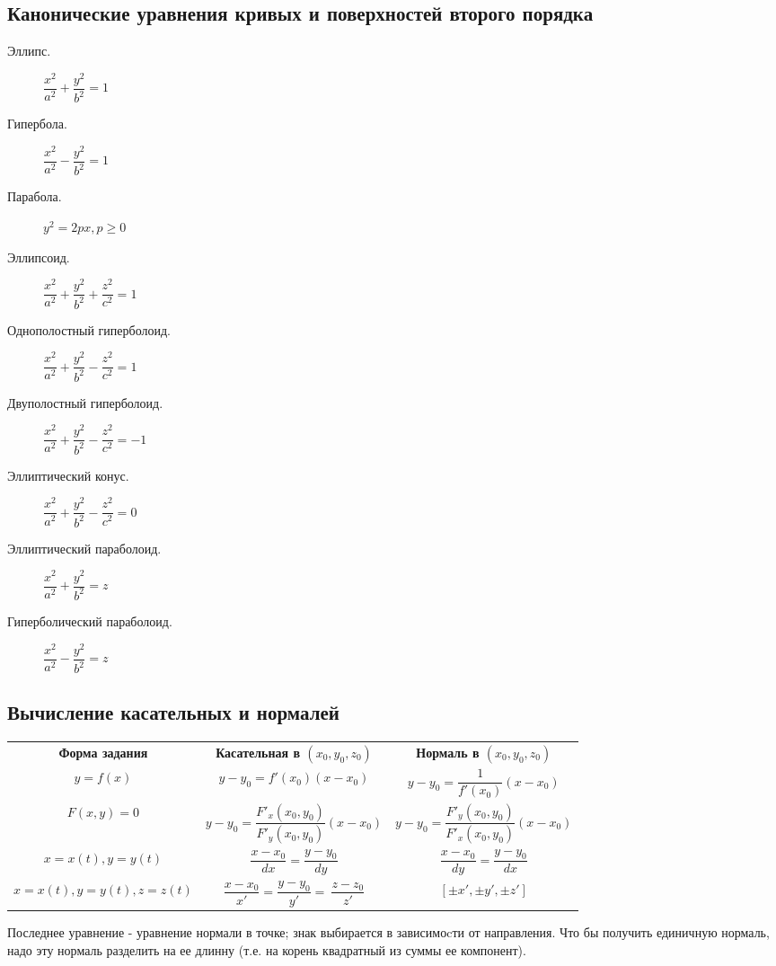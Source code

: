 \documentclass[a4paper,12pt]{scrartcl}
\begin{document}
\subsection{Канонические уравнения кривых и поверхностей второго порядка}
\begin{multicols}{2}
\begin{description}
\item [Эллипс.] $\dfrac{x^2}{a^2} + \dfrac{y^2}{b^2} = 1$
\item [Гипербола.] $\dfrac{x^2}{a^2} - \dfrac{y^2}{b^2} = 1$
\item [Парабола.] $y^2 = 2px, p \geqslant 0$
\item [Эллипсоид.] $\dfrac{x^2}{a^2} + \dfrac{y^2}{b^2} + \dfrac{z^2}{c^2} = 1$
\end{description}
\end{multicols}
\begin{description}
\item [Однополостный гиперболоид.] $\dfrac{x^2}{a^2} + \dfrac{y^2}{b^2} - \dfrac{z^2}{c^2} = 1$
\item [Двуполостный гиперболоид.] $\dfrac{x^2}{a^2} + \dfrac{y^2}{b^2} - \dfrac{z^2}{c^2} = -1$
\item [Эллиптический конус.] $\dfrac{x^2}{a^2} + \dfrac{y^2}{b^2} - \dfrac{z^2}{c^2} = 0$
\item [Эллиптический параболоид.] $\dfrac{x^2}{a^2} + \dfrac{y^2}{b^2} = z$
\item [Гиперболический параболоид.] $\dfrac{x^2}{a^2} - \dfrac{y^2}{b^2} = z$
\end{description}
\subsection{Вычисление касательных и нормалей}
\begin{tabular}{|c|c|c|}
{\bfseries Форма задания} & \bfseries{Касательная в $(x_0,y_0,z_0)$} &{\bfseries Нормаль в $(x_0,y_0,z_0)$} \\
$ y = f(x)$ & $y - y_0 = f'(x_0)(x-x_0)$ & $y - y_0 = \dfrac{1}{f'(x_0)}(x-x_0)$ \\
$ F(x,y) = 0$ & $y - y_0 = \dfrac{F'_x(x_0,y_0)}{F'_y(x_0,y_0)}(x-x_0)$ & $y - y_0 = \dfrac{F'_y(x_0,y_0)}{F'_x(x_0,y_0)}(x-x_0)$ \\
$ x=x(t),y=y(t)$ & $\dfrac{x-x_0}{dx} = \dfrac{y-y_0}{dy}$&$\dfrac{x-x_0}{dy} = \dfrac{y-y_0}{dx}$\\
$x =x (t), y = y(t), z= z(t)$ & $\dfrac{x-x_0}{x'} = \dfrac{y-y_0}{y'} = \ \dfrac{z-z_0}{z'} $ & $[\pm x',\pm y',\pm z']$
\end{tabular}
Последнее уравнение - уравнение нормали в точке; знак выбирается в зависимоcти от направления. Что бы получить единичную нормаль, надо эту нормаль разделить на ее длинну (т.е. на корень квадратный из суммы ее компонент).
\end{document}
